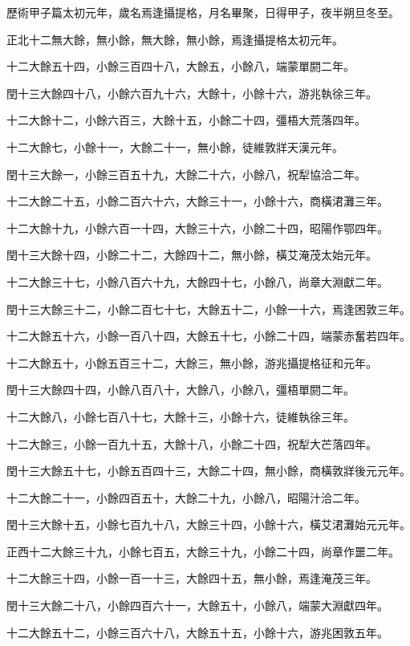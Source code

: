 歷術甲子篇太初元年，歲名焉逢攝提格，月名畢聚，日得甲子，夜半朔旦冬至。

正北十二無大餘，無小餘，無大餘，無小餘，焉逢攝提格太初元年。

十二大餘五十四，小餘三百四十八，大餘五，小餘八，端蒙單閼二年。

閏十三大餘四十八，小餘六百九十六，大餘十，小餘十六，游兆執徐三年。

十二大餘十二，小餘六百三，大餘十五，小餘二十四，彊梧大荒落四年。

十二大餘七，小餘十一，大餘二十一，無小餘，徒維敦牂天漢元年。

閏十三大餘一，小餘三百五十九，大餘二十六，小餘八，祝犁協洽二年。

十二大餘二十五，小餘二百六十六，大餘三十一，小餘十六，商橫涒灘三年。

十二大餘十九，小餘六百一十四，大餘三十六，小餘二十四，昭陽作鄂四年。

閏十三大餘十四，小餘二十二，大餘四十二，無小餘，橫艾淹茂太始元年。

十二大餘三十七，小餘八百六十九，大餘四十七，小餘八，尚章大淵獻二年。

閏十三大餘三十二，小餘二百七十七，大餘五十二，小餘一十六，焉逢困敦三年。

十二大餘五十六，小餘一百八十四，大餘五十七，小餘二十四，端蒙赤奮若四年。

十二大餘五十，小餘五百三十二，大餘三，無小餘，游兆攝提格征和元年。

閏十三大餘四十四，小餘八百八十，大餘八，小餘八，彊梧單閼二年。

十二大餘八，小餘七百八十七，大餘十三，小餘十六，徒維執徐三年。

十二大餘三，小餘一百九十五，大餘十八，小餘二十四，祝犁大芒落四年。

閏十三大餘五十七，小餘五百四十三，大餘二十四，無小餘，商橫敦牂後元元年。

十二大餘二十一，小餘四百五十，大餘二十九，小餘八，昭陽汁洽二年。

閏十三大餘十五，小餘七百九十八，大餘三十四，小餘十六，橫艾涒灘始元元年。

正西十二大餘三十九，小餘七百五，大餘三十九，小餘二十四，尚章作噩二年。

十二大餘三十四，小餘一百一十三，大餘四十五，無小餘，焉逢淹茂三年。

閏十三大餘二十八，小餘四百六十一，大餘五十，小餘八，端蒙大淵獻四年。

十二大餘五十二，小餘三百六十八，大餘五十五，小餘十六，游兆困敦五年。

